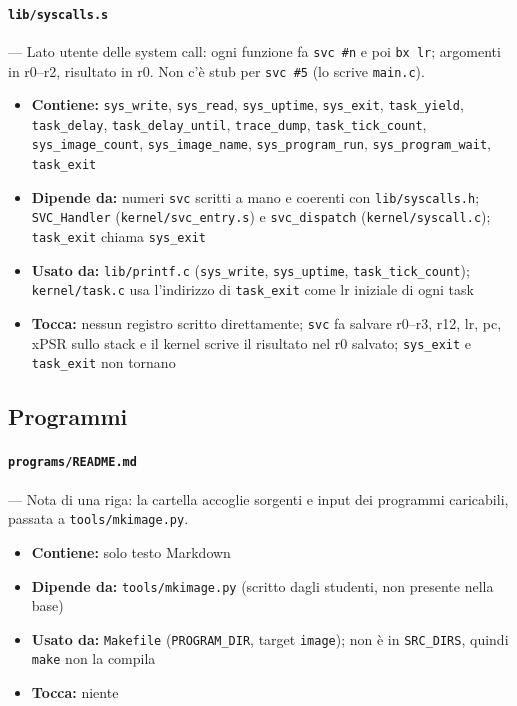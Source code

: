 \paragraph{\texttt{lib/syscalls.s}} --- Lato utente delle system call: ogni funzione fa \texttt{svc \#n} e poi \texttt{bx lr}; argomenti in r0--r2, risultato in r0. Non c'è stub per \texttt{svc \#5} (lo scrive \texttt{main.c}).
\begin{itemize}
  \item \textbf{Contiene:} \texttt{sys\_write}, \texttt{sys\_read}, \texttt{sys\_uptime}, \texttt{sys\_exit}, \texttt{task\_yield}, \texttt{task\_delay}, \texttt{task\_delay\_until}, \texttt{trace\_dump}, \texttt{task\_tick\_count}, \texttt{sys\_image\_count}, \texttt{sys\_image\_name}, \texttt{sys\_program\_run}, \texttt{sys\_program\_wait}, \texttt{task\_exit}
  \item \textbf{Dipende da:} numeri \texttt{svc} scritti a mano e coerenti con \texttt{lib/syscalls.h}; \texttt{SVC\_Handler} (\texttt{kernel/svc\_entry.s}) e \texttt{svc\_dispatch} (\texttt{kernel/syscall.c}); \texttt{task\_exit} chiama \texttt{sys\_exit}
  \item \textbf{Usato da:} \texttt{lib/printf.c} (\texttt{sys\_write}, \texttt{sys\_uptime}, \texttt{task\_tick\_count}); \texttt{kernel/task.c} usa l'indirizzo di \texttt{task\_exit} come lr iniziale di ogni task
  \item \textbf{Tocca:} nessun registro scritto direttamente; \texttt{svc} fa salvare r0--r3, r12, lr, pc, xPSR sullo stack e il kernel scrive il risultato nel r0 salvato; \texttt{sys\_exit} e \texttt{task\_exit} non tornano
\end{itemize}

\subsection{Programmi}

\paragraph{\texttt{programs/README.md}} --- Nota di una riga: la cartella accoglie sorgenti e input dei programmi caricabili, passata a \texttt{tools/mkimage.py}.
\begin{itemize}
  \item \textbf{Contiene:} solo testo Markdown
  \item \textbf{Dipende da:} \texttt{tools/mkimage.py} (scritto dagli studenti, non presente nella base)
  \item \textbf{Usato da:} \texttt{Makefile} (\texttt{PROGRAM\_DIR}, target \texttt{image}); non è in \texttt{SRC\_DIRS}, quindi \texttt{make} non la compila
  \item \textbf{Tocca:} niente
\end{itemize}

